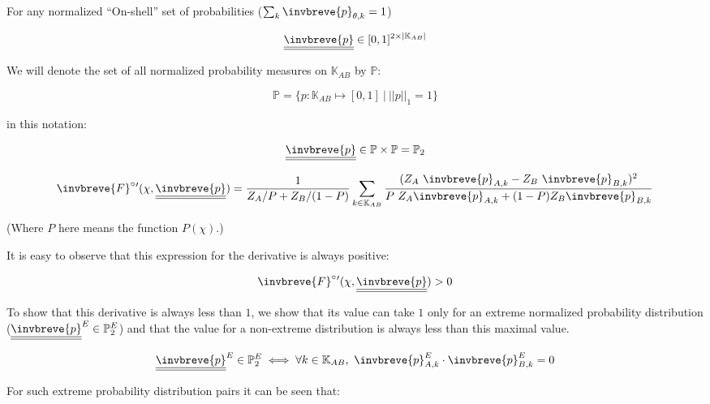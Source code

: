 \documentclass{article}
\theoremstyle{definition}
\begin{document}
For any normalized ``On-shell''\cite{book:Weinberg} set of probabilities ($\sum_k \invbreve{p}_{\theta,k} =1$)

    \begin{equation}
        \underline{\underline{\invbreve{p}}} \in [0,1]^{2 \times |\mathbb{K}_{AB}|}
    \end{equation}

We will denote the set of all normalized probability measures on $\mathbb{K}_{AB}$ by $\mathbb{P}$:

\begin{equation}
    \mathbb{P} = \{ p:\mathbb{K}_{AB} \mapsto [0,1] \ | \  ||p||_1 = 1 \} 
\end{equation}

in this notation:

\begin{equation}
    \underline{\underline{\invbreve{p}}} \in
    \mathbb{P} \times \mathbb{P} = \mathbb{P}_2
\end{equation}
    
\begin{equation}
    \invbreve{F}^\circ{}'(\chi,\underline{\underline{\invbreve{p}}})
    =
    \frac{1}{Z_A/P+Z_B/(1-P)} \sum_{k \in \mathbb{K}_{AB}} \frac{(Z_A \ \invbreve{p}_{A,k} - Z_B \ \invbreve{p}_{B,k})^2}{P \ Z_A \invbreve{p}_{A,k} + (1-P) Z_B \invbreve{p}_{B,k}}
\end{equation}

(Where $P$ here means the function $P(\chi)$.)

It is easy to observe that this expression for the derivative is always positive:

\begin{equation}
    \invbreve{F}^\circ{}'(\chi,\underline{\underline{\invbreve{p}}}) > 0
\end{equation}

To show that this derivative is always less than $1$, we show that its value can take $1$ only for an extreme normalized probability distribution ($\underline{\underline{\invbreve{p}}}^E \in \mathbb{P}_2^E$) and that the value for a non-extreme distribution is always less than this maximal value.

\begin{equation}
    \underline{\underline{\invbreve{p}}}^E \in \mathbb{P}_2^E \iff 
    \forall k \in \mathbb{K}_{AB}, \ 
    \invbreve{p}^E_{A,k} \cdot \invbreve{p}^E_{B,k} = 0
\end{equation}

For such extreme probability distribution pairs it can be seen that:
\end{document}

